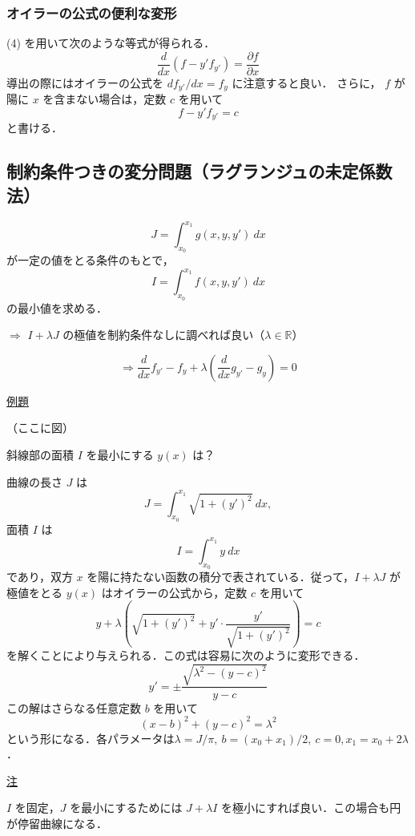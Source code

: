 \documentclass{jsarticle}
\begin{document}
\subsubsection{オイラーの公式の便利な変形}
(4) を用いて次のような等式が得られる．
\begin{equation}
\frac{d}{dx} \left( f -y'f_{y'} \right) = \frac{\partial f}{\partial x}
\end{equation}
導出の際にはオイラーの公式を $df_{y'}/dx = f_y$ に注意すると良い．
さらに， $f$ が陽に $x$ を含まない場合は，定数 $c$ を用いて
\begin{equation}
f-y'f_{y'} = c
\end{equation}
と書ける．
\subsection{制約条件つきの変分問題（ラグランジュの未定係数法）}
\begin{equation}
J=\int_{x_0}^{x_1} g(x,y,y')\ dx
\end{equation}
が一定の値をとる条件のもとで，
\begin{equation}
I=\int_{x_0}^{x_1} f(x,y,y')\ dx
\end{equation}
の最小値を求める．

$\Rightarrow$ $ I +\lambda J$ の極値を制約条件なしに調べれば良い（$\lambda \in \mathbb{R}$）

\begin{equation}
\Rightarrow \frac{d}{dx} f_{y'} -f_y +\lambda \left( \frac{d}{dx} g_{y'} -g_y \right) = 0
\end{equation}

\underline{例題}

（ここに図）

斜線部の面積 $I$ を最小にする $y(x)$ は？

曲線の長さ $J$ は
\begin{equation}
J = \int_{x_0}^{x_1} \sqrt{1+(y')^2}\ dx,
\end{equation}
面積 $I$ は
\begin{equation}
I = \int_{x_0}^{x_1} y\ dx
\end{equation}
であり，双方 $x$ を陽に持たない函数の積分で表されている．従って，$I + \lambda J$ が極値をとる $y(x)$ はオイラーの公式から，定数 $c$ を用いて
\begin{equation}
y +\lambda \left( \sqrt{1+(y')^2}+ y'\cdot \frac{y'}{\sqrt{1+(y')^2}}  \right) = c
\end{equation}
を解くことにより与えられる．この式は容易に次のように変形できる．
\begin{equation}
y' = \pm \frac{\sqrt{\lambda^2 -(y-c)^2}}{y-c}
\end{equation}
この解はさらなる任意定数 $b$ を用いて
\begin{equation}
(x-b)^2 + (y-c)^2 = \lambda^2
\end{equation}
という形になる．各パラメータは$\lambda =J/\pi,\ b=(x_0+x_1)/2,\ c = 0, x_1 =x_0 +2\lambda$．

\underline{注}

 $I$ を固定，$J$ を最小にするためには $J +\lambda I$ を極小にすれば良い．この場合も円が停留曲線になる．
\end{document}
